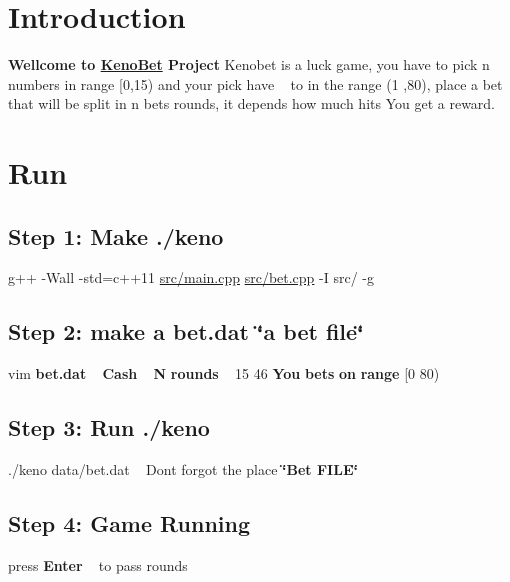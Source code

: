 \hypertarget{index_intro_sec}{}\section{Introduction}\label{index_intro_sec}
{\bfseries Wellcome to \hyperlink{classKenoBet}{Keno\+Bet} Project} Kenobet is a luck game, you have to pick n numbers in range \mbox{[}0,15) and your pick have ~\newline
 to in the range (1 ,80), place a bet that will be split in n bets rounds, it depends how much hits You get a reward. ~\newline
 \hypertarget{index_install_sec}{}\section{Run}\label{index_install_sec}
\hypertarget{index_step1}{}\subsection{Step 1\+: Make ./keno}\label{index_step1}
g++ -\/\+Wall -\/std=c++11 \hyperlink{main_8cpp}{src/main.\+cpp} \hyperlink{bet_8cpp}{src/bet.\+cpp} -\/I src/ -\/g\hypertarget{index_step2}{}\subsection{Step 2\+: make a bet.\+dat \char`\"{}a bet file\char`\"{}}\label{index_step2}
vim {\bfseries bet.\+dat} ~ {\bfseries Cash} ~ {\bfseries N} {\bfseries rounds} ~ 15 46 {\bfseries You} {\bfseries bets} {\bfseries on} {\bfseries range} {\bfseries }\mbox{[}0 80) ~\newline
 \hypertarget{index_step3}{}\subsection{Step 3\+: Run ./keno}\label{index_step3}
./keno data/bet.\+dat ~\newline
 Dont forgot the place {\bfseries \char`\"{}\+Bet F\+I\+L\+E\char`\"{}}  \hypertarget{index_step4}{}\subsection{Step 4\+: Game Running}\label{index_step4}
press {\bfseries Enter} ~\newline
 to pass rounds~\newline
